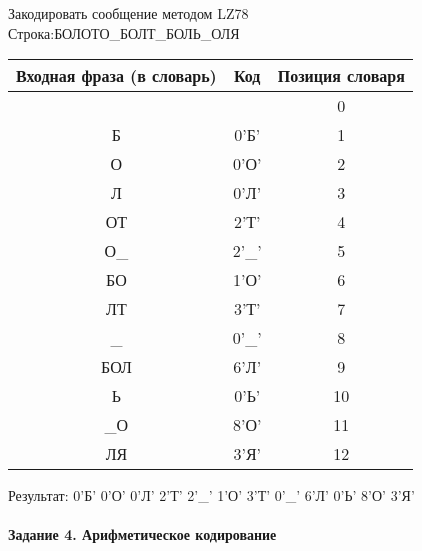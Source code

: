 \documentclass[a4paper, 12pt]{article}
\begin{document}
Закодировать сообщение методом LZ78\\
Строка:БОЛОТО\_БОЛТ\_БОЛЬ\_ОЛЯ\\
\begin{table}[h!]
\centering
\begin{tabular}{|c|c|c|} 
\hline
 Входная фраза (в словарь) & Код & Позиция словаря \\ \hline

 &  & 0 \\ \hline
Б & 0'Б' & 1 \\ \hline
О & 0'О' & 2 \\ \hline
Л & 0'Л' & 3 \\ \hline
ОТ & 2'Т' & 4 \\ \hline
О\_ & 2'\_' & 5 \\ \hline
БО & 1'О' & 6 \\ \hline
ЛТ & 3'Т' & 7 \\ \hline
\_ & 0'\_' & 8 \\ \hline
БОЛ & 6'Л' & 9 \\ \hline
Ь & 0'Ь' & 10 \\ \hline
\_О & 8'О' & 11 \\ \hline
ЛЯ & 3'Я' & 12 \\ \hline
\end{tabular}
\end{table}

Результат: 0'Б' 0'О' 0'Л' 2'Т' 2'\_' 1'О' 3'Т' 0'\_' 6'Л' 0'Ь' 8'О' 3'Я'\\
\pagebreak
\paragraph{Задание 4. Арифметическое кодирование\\}
\end{document}
